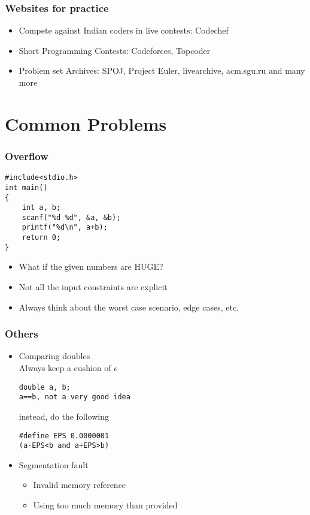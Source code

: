 \documentclass{beamer}
\begin{document}
\begin{frame}
	\frametitle{Websites for practice}

\begin{itemize}
\item{Compete against Indian coders in live contests: Codechef}
\item{Short Programming Contests: Codeforces, Topcoder}
\item{Problem set Archives: SPOJ, Project Euler, livearchive, acm.sgu.ru and many more}
\end{itemize}
\end{frame}

\section{Common Problems}
\begin{frame}[fragile]
	\frametitle{Overflow}

\begin{verbatim}
#include<stdio.h>
int main()
{
	int a, b;
	scanf("%d %d", &a, &b);
	printf("%d\n", a+b);
	return 0;
}
\end{verbatim}
\pause 
\begin{itemize}
\item What if the given numbers are HUGE?
\pause
\item Not all the input constraints are explicit
\pause 
\item Always think about the worst case scenario, edge cases, etc.
\end{itemize}	
\end{frame}

\begin{frame}[fragile]
	\frametitle{Others}

\begin{itemize}
\item Comparing doubles \\ Always keep a cushion of $\epsilon$ \\
\pause
\begin{verbatim}
double a, b;
a==b, not a very good idea
\end{verbatim}
\pause
instead, do the following
\begin{verbatim}
#define EPS 0.0000001
(a-EPS<b and a+EPS>b)
\end{verbatim}
\pause
\item Segmentation fault
\pause
\begin{itemize}
\item Invalid memory reference
\item Using too much memory than provided
\end{itemize}
\end{itemize}
\end{frame}
\end{document}
